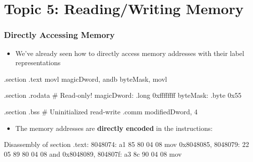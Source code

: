 \documentclass[11pt,xcolor=dvipsnames]{beamer}
\begin{document}
\section{Topic 5: Reading/Writing Memory}

\begin{frame}[fragile,t]
\frametitle{Directly Accessing Memory}
\begin{itemize}
  \item We've already seen how to directly access memory addresses with their label representations
\end{itemize}
\begin{gascode}
.section .text
  movl magicDword, %
  andb byteMask, %
  movl %

.section .rodata          # Read-only!
  magicDword: .long 0xffffffff
  byteMask:   .byte 0x55

.section .bss             # Uninitialized read-write
  .comm modifiedDword, 4
\end{gascode}
\pause
\begin{itemize}
  \item The memory addresses are {\bf directly encoded} in the instructions:
\end{itemize}
\begin{customobjdumpcode}
Disassembly of section .text:
 8048074: a1 85 80 04 08        mov    0x8048085,%
 8048079: 22 05 89 80 04 08     and    0x8048089,%
 804807f: a3 8c 90 04 08        mov    %
\end{customobjdumpcode}
\end{frame}
\end{document}
